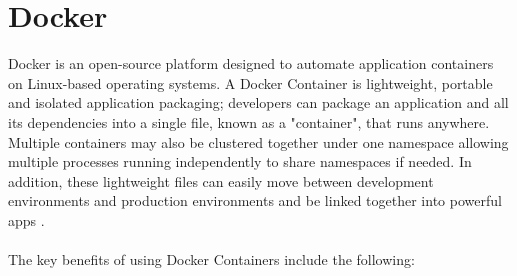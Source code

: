 \documentclass[BIF,Bachelor,nenglish]{twbook}%
\begin{document}
\section{Docker}
Docker is an open-source platform designed to automate application containers on Linux-based operating systems. A Docker Container is lightweight, portable and isolated application packaging; developers can package an application and all its dependencies into a single file, known as a "container", that runs anywhere. Multiple containers may also be clustered together under one namespace allowing multiple processes running independently to share namespaces if needed. In addition, these lightweight files can easily move between development environments and production environments and be linked together into powerful apps \cite{rad2017}.
\\
\\
The key benefits of using Docker Containers include the following:
\end{document}
